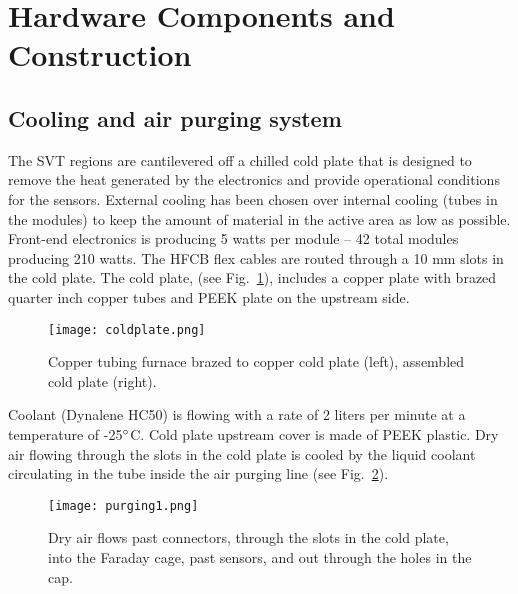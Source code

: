 \section{Hardware Components and Construction}

\subsection{Cooling and air purging system}

The SVT regions are cantilevered off a chilled cold plate that is designed to remove the heat generated by the electronics and provide operational  conditions for the sensors. External cooling has been chosen over internal cooling (tubes in the modules) to keep the amount of material in the active area as low as possible. Front-end electronics is producing 5 watts per module -- 42 total modules producing 210 watts. The HFCB flex cables are routed through a 10 mm slots in the cold plate. The cold plate, (see Fig.~\ref{fig:coldplate}), includes a copper plate with brazed quarter inch copper tubes and PEEK plate on the upstream side. 

\begin{figure}[hbt] 
\centering 
\texttt{[image: coldplate.png]}
\caption{Copper tubing furnace brazed to copper cold plate (left), assembled cold plate (right).}
\label{fig:coldplate}
\end{figure}


Coolant (Dynalene HC50) is flowing with a rate of 2 liters per minute at a temperature of -25$\degree$C. Cold plate upstream cover is made of PEEK plastic. Dry air flowing through the slots in the cold plate is cooled by the liquid coolant circulating in the tube inside the air purging line (see Fig.~\ref{fig:purging1}). 

\begin{figure}[hbt] 
\centering 
\texttt{[image: purging1.png]}
\caption{Dry air flows past connectors, through the slots in the cold plate, into the Faraday cage, past sensors, and out through the holes in the cap.}
\label{fig:purging1}
\end{figure}

